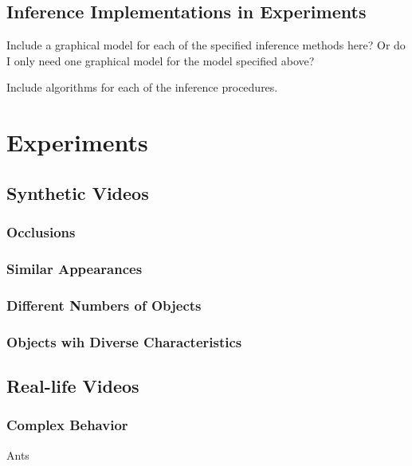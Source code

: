 \documentclass{article}
\begin{document}
\subsection{Inference Implementations in Experiments}
%
Include a graphical model for each of the specified inference methods here? Or do I only need one graphical model for the model specified above?

Include algorithms for each of the inference procedures.










\section*{Experiments}





\subsection{Synthetic Videos}

\subsubsection{Occlusions}

\subsubsection{Similar Appearances}

\subsubsection{Different Numbers of Objects}

\subsubsection{Objects wih Diverse Characteristics}






\subsection{Real-life Videos}

\subsubsection{Complex Behavior}
%
Ants
\end{document}
